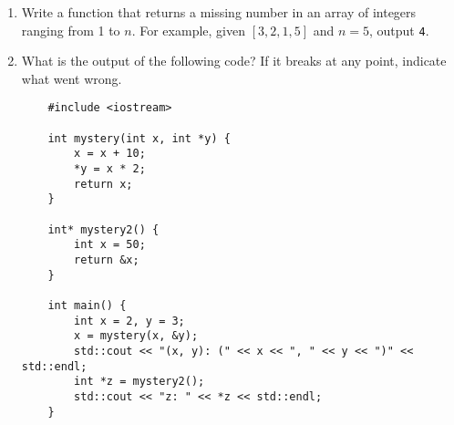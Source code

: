 \documentclass[11pt]{article}
\begin{document}
\begin{enumerate}[leftmargin=*]
\item Write a function that returns a missing number in an array of integers ranging from 1 to $n$. For example, given $[3, 2, 1, 5]$ and $n=5$, output \verb|4|.

\item What is the output of the following code? If it breaks at any point, indicate what went wrong.
\begin{verbatim}
    #include <iostream>

    int mystery(int x, int *y) {
        x = x + 10;
        *y = x * 2;
        return x;
    }

    int* mystery2() {
        int x = 50;
        return &x;
    }

    int main() {
        int x = 2, y = 3;
        x = mystery(x, &y);
        std::cout << "(x, y): (" << x << ", " << y << ")" << std::endl;
        int *z = mystery2();
        std::cout << "z: " << *z << std::endl;
    }
\end{verbatim}

\end{enumerate}

\label{r:lastpage}
\end{document}
